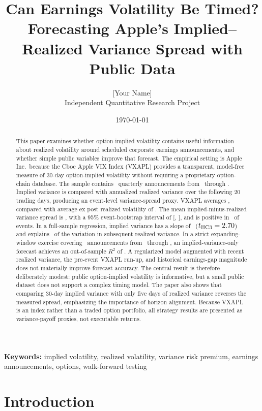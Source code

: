 \documentclass[11pt]{article}
\title{\textbf{Can Earnings Volatility Be Timed?}\\
\large Forecasting Apple's Implied--Realized Variance Spread with Public Data}
\author{[Your Name]\\
\small Independent Quantitative Research Project}
\date{\today}
\begin{document}
\maketitle

\begin{abstract}
This paper examines whether option-implied volatility contains useful information about realized volatility around scheduled corporate earnings announcements, and whether simple public variables improve that forecast. The empirical setting is Apple Inc.\ because the Cboe Apple VIX Index (VXAPL) provides a transparent, model-free measure of 30-day option-implied volatility without requiring a proprietary option-chain database. The sample contains \SampleN\ quarterly announcements from \SampleStart\ through \SampleEnd. Implied variance is compared with annualized realized variance over the following 20 trading days, producing an event-level variance-spread proxy. VXAPL averages \MeanVXAPL, compared with average ex post realized volatility of \MeanRV. The mean implied-minus-realized variance spread is \MeanVRP, with a 95\% event-bootstrap interval of [\VRPCILow, \VRPCIHigh], and is positive in \VRPPositiveRate\ of events. In a full-sample regression, implied variance has a slope of \IVSlope\ ($t_{\mathrm{HC3}}=2.70$) and explains \IVRsquared\ of the variation in subsequent realized variance. In a strict expanding-window exercise covering \TestN\ announcements from \TestStart\ through \TestEnd, an implied-variance-only forecast achieves an out-of-sample $R^2$ of \IVOOSRsquared. A regularized model augmented with recent realized variance, the pre-event VXAPL run-up, and historical earnings-gap magnitude does not materially improve forecast accuracy. The central result is therefore deliberately modest: public option-implied volatility is informative, but a small public dataset does not support a complex timing model. The paper also shows that comparing 30-day implied variance with only five days of realized variance reverses the measured spread, emphasizing the importance of horizon alignment. Because VXAPL is an index rather than a traded option portfolio, all strategy results are presented as variance-payoff proxies, not executable returns.
\end{abstract}

\vspace{0.5em}
\noindent\textbf{Keywords:} implied volatility, realized volatility, variance risk premium, earnings announcements, options, walk-forward testing

\section{Introduction}
\end{document}
